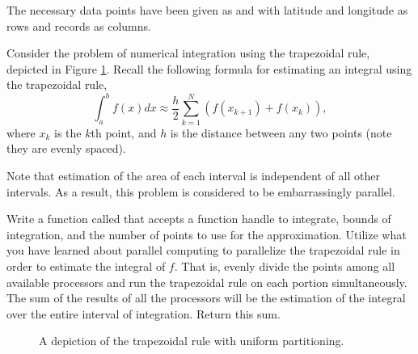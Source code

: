 The necessary data points have been given as  and  with latitude and longitude as rows and records as columns.

Consider the problem of numerical integration using the trapezoidal rule, depicted in Figure \ref{fig:traprule}.
Recall the following formula for estimating an integral using the trapezoidal rule,
\[
\int_{a}^b f(x) dx \approx \frac{h}{2} \sum_{k=1}^N (f(x_{k+1}) + f(x_k)),
\]
where $x_k$ is the $k$th point, and $h$ is the distance between any two points (note they are evenly spaced).

Note that estimation of the area of each interval is independent of all other intervals. 
As a result, this problem is considered to be embarrassingly parallel.

Write a function called  that accepts a function handle to integrate, bounds of integration, and the number of points to use for the approximation. 
Utilize what you have learned about parallel computing to parallelize the trapezoidal rule in order to estimate the integral of $f$. 
That is, evenly divide the points among all available processors and run the trapezoidal rule on each portion simultaneously.
The sum of the results of all the processors will be the estimation of the integral over the entire interval of integration.
Return this sum. 

\begin{figure}[H]

\begin{center}
		
\end{center}
\label{fig:traprule}
\caption{A depiction of the trapezoidal rule with uniform partitioning.}
\end{figure}



